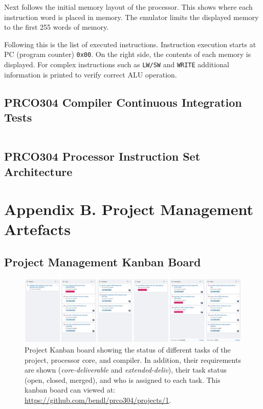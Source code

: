 \documentclass[11pt,a4paper]{report}
\newcommand{\scname}{PRCO304}
\begin{document}
Next follows the initial memory layout of the processor. This shows where each instruction word is placed in memory. The emulator limits the displayed memory to the first 255 words of memory.

Following this is the list of executed instructions. Instruction execution starts at PC  (program counter) \verb|0x00|. On the right side, the contents of each memory is displayed. For complex instructions such as \verb|LW/SW| and \verb|WRITE| additional information is printed to verify correct ALU operation.
\normalsize

\subsection{\scname{} Compiler Continuous Integration Tests}
\label{appendix:travisci}
\inputminted{text}{compiler_ci.txt}

\newpage
\subsection{\scname{} Processor Instruction Set Architecture}
\label{appendix:isa}


\newpage
\section{Appendix B. Project Management Artefacts}


\newpage



\newpage
\begin{landscape}
\subsection{Project Management Kanban Board}
\begin{figure}[H]
\centering
\includegraphics[scale=0.55]{kanban2}
\caption{Project Kanban board showing the status of different tasks of the project, processor core, and compiler. In addition, their requirements are shown (\textit{core-deliverable} and \textit{extended-deliv}), their task status (open, closed, merged), and who is assigned to each task. This kanban board can viewed at: \url{https://github.com/bendl/prco304/projects/1}.}
\label{kanban}
\end{figure}
\end{landscape}
\end{document}
